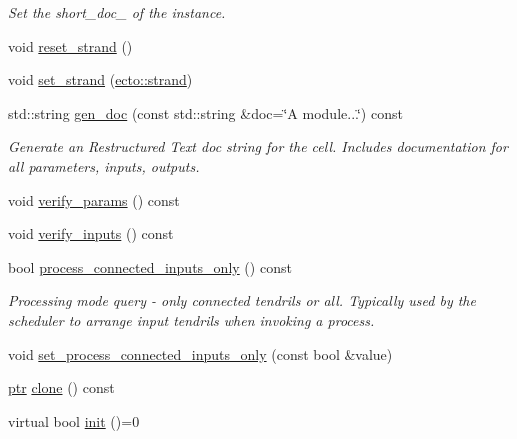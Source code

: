\begin{DoxyCompactItemize}
\begin{DoxyCompactList}\small\item\em Set the short\+\_\+doc\+\_\+ of the instance. \end{DoxyCompactList}\item 
void \hyperlink{structecto_1_1cell_af32a9e2113b7afcb5b225bdc3c234e8c}{reset\+\_\+strand} ()
\item 
void \hyperlink{structecto_1_1cell_ae0009fc4a4d12d400126f455396f5c9f}{set\+\_\+strand} (\hyperlink{structecto_1_1strand}{ecto\+::strand})
\item 
std\+::string \hyperlink{structecto_1_1cell_a486454d7466c5f0373ecb42dd4e97b2f}{gen\+\_\+doc} (const std\+::string \&doc=\char`\"{}A module...\char`\"{}) const 
\begin{DoxyCompactList}\small\item\em Generate an Restructured Text doc string for the cell. Includes documentation for all parameters, inputs, outputs. \end{DoxyCompactList}\item 
void \hyperlink{structecto_1_1cell_aa03c0f569bb4b14e81f4d2a8747273e5}{verify\+\_\+params} () const 
\item 
void \hyperlink{structecto_1_1cell_aed712e80344ce04dbb9105bb6a1aa53a}{verify\+\_\+inputs} () const 
\item 
bool \hyperlink{structecto_1_1cell_ab1dfafd237e0adf273af65d549e7516e}{process\+\_\+connected\+\_\+inputs\+\_\+only} () const 
\begin{DoxyCompactList}\small\item\em Processing mode query -\/ only connected tendrils or all. Typically used by the scheduler to arrange input tendrils when invoking a process. \end{DoxyCompactList}\item 
void \hyperlink{structecto_1_1cell_a4c42ef400acac92d825e7dc25ff53bdc}{set\+\_\+process\+\_\+connected\+\_\+inputs\+\_\+only} (const bool \&value)
\item 
\hyperlink{structecto_1_1cell_af2cab9d2bc012088c4f58c40da57a862}{ptr} \hyperlink{structecto_1_1cell_a213dabd285300f5d4c7e0f5fd6142e81}{clone} () const 
\item 
virtual bool \hyperlink{structecto_1_1cell_ab9a6c3fd8f76289f338a9e05368b1aff}{init} ()=0
\end{DoxyCompactItemize}
